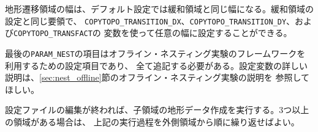 地形遷移領域の幅は、デフォルト設定では緩和領域と同じ幅になる。緩和領域の設定と同じ要領で、
\verb|COPYTOPO_TRANSITION_DX|、\verb|COPYTOPO_TRANSITION_DY|、および\verb|COPYTOPO_TRANSFACT|の
変数を使って任意の幅に設定することができる。

最後の\verb|PARAM_NEST|の項目はオフライン・ネスティング実験のフレームワークを利用するための設定項目であり、
全て追記する必要がある。設定変数の詳しい説明は、\ref{sec:nest_offline}節のオフライン・ネスティング実験の説明を
参照してほしい。

設定ファイルの編集が終われば、子領域の地形データ作成を実行する。3つ以上の領域がある場合は、
上記の実行過程を外側領域から順に繰り返せばよい。



